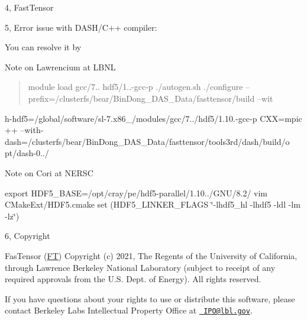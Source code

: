 4, Fast\+Tensor


\begin{DoxyCode}{0}

\end{DoxyCode}


5, Error issue with DASH/\+C++ compiler\+:


\begin{DoxyCode}{0}

\end{DoxyCode}


You can resolve it by


\begin{DoxyCode}{0}

\end{DoxyCode}


Note on Lawrencium at LBNL

\begin{quote}
module load gcc/7.. hdf5/1..-\/gcc-\/p ./autogen.sh ./configure --prefix=/clusterfs/bear/\+Bin\+Dong\+\_\+\+DAS\+\_\+\+Data/fasttensor/build --wit \end{quote}
h-\/hdf5=/global/software/sl-\/7.x86\+\_/modules/gcc/7../hdf5/1.10.-\/gcc-\/p CXX=mpic ++ --with-\/dash=/clusterfs/bear/\+Bin\+Dong\+\_\+\+DAS\+\_\+\+Data/fasttensor/tools3rd/dash/build/o pt/dash-\/0../

Note on Cori at NERSC

export HDF5\+\_\+\+BASE=/opt/cray/pe/hdf5-\/parallel/1.10../\+GNU/8.2/ vim CMake\+Ext/\+HDF5.\+cmake set (HDF5\+\_\+\+LINKER\+\_\+\+FLAGS \char`\"{}-\/lhdf5\+\_\+hl -\/lhdf5 -\/ldl -\/lm -\/lz\char`\"{})

6, Copyright



Fas\+Tensor (\mbox{\hyperlink{namespace_f_t}{FT}}) Copyright (c) 2021, The Regents of the University of California, through Lawrence Berkeley National Laboratory (subject to receipt of any required approvals from the U.\+S. Dept. of Energy). All rights reserved.

If you have questions about your rights to use or distribute this software, please contact Berkeley Lab\textquotesingle{}s Intellectual Property Office at \href{mailto:IPO@lbl.gov}{\texttt{ IPO@lbl.\+gov}}.

